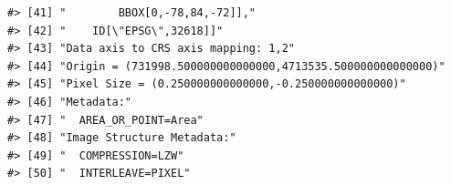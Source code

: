 \documentclass[
]{book}
\begin{document}
\begin{verbatim}
#> [41] "        BBOX[0,-78,84,-72]],"                                                                                                                                                                                                                                                   
#> [42] "    ID[\"EPSG\",32618]]"                                                                                                                                                                                                                                                        
#> [43] "Data axis to CRS axis mapping: 1,2"                                                                                                                                                                                                                                             
#> [44] "Origin = (731998.500000000000000,4713535.500000000000000)"                                                                                                                                                                                                                      
#> [45] "Pixel Size = (0.250000000000000,-0.250000000000000)"                                                                                                                                                                                                                            
#> [46] "Metadata:"                                                                                                                                                                                                                                                                      
#> [47] "  AREA_OR_POINT=Area"                                                                                                                                                                                                                                                           
#> [48] "Image Structure Metadata:"                                                                                                                                                                                                                                                      
#> [49] "  COMPRESSION=LZW"                                                                                                                                                                                                                                                              
#> [50] "  INTERLEAVE=PIXEL"                                                                                                                                                                                                                                                             

\end{verbatim}
\end{document}
